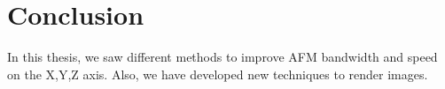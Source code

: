 \chapter{Conclusion}

In this thesis, we saw different methods to improve AFM bandwidth and speed on the X,Y,Z axis. Also, we have developed new techniques to render images.